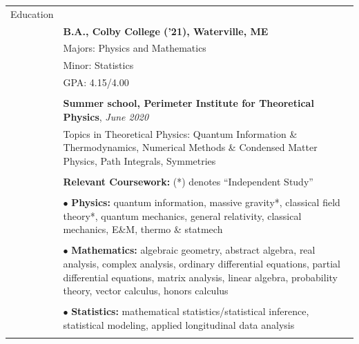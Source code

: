 \documentclass[10pt]{article}
\begin{document}
\noindent \begin{longtable}{ l m{14.5cm}   }

	
  \large{Education}    	& \\ 
  						& \textbf{B.A., Colby College ('21), Waterville, ME} \\
     				 	& Majors: Physics and Mathematics \\
     				 	& Minor: Statistics  \\
     					& GPA: 4.15/4.00 \\
	 					& \\
	 					
	 					&\textbf{Summer school, Perimeter Institute for Theoretical Physics}, \textit{June 2020} \\
	 					& Topics in Theoretical Physics: Quantum Information \& Thermodynamics, Numerical Methods \& Condensed Matter Physics, Path Integrals, Symmetries \\
	 					&\\
	 					
	 					& \textbf{Relevant Coursework:} (*) denotes ``Independent Study'' \\ \vspace{-12pt}
	 					& \\
	 					& $\bullet$ \textbf{Physics:} quantum information, massive gravity*, classical field theory*, quantum mechanics,  general relativity, classical mechanics, E\&M, thermo \& statmech\\  \vspace{-9pt}
	 					& \\
	 					& $\bullet$ \textbf{Mathematics:} algebraic geometry, abstract algebra, real analysis, complex analysis, ordinary differential equations, partial differential equations, matrix analysis, linear algebra, probability theory, vector calculus, honors calculus\\   \vspace{-9pt}
	 					& \\ 
	 					& $\bullet$ \textbf{Statistics:} mathematical statistics/statistical inference,  statistical modeling, applied longitudinal data analysis\\
	 					& \\
    

\end{longtable}
\end{document}
